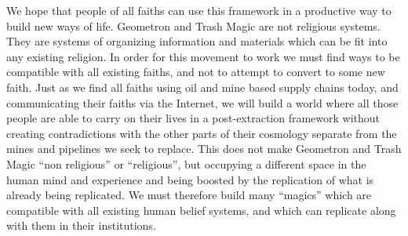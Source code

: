 We hope that people of all faiths can use this framework in a productive
way to build new ways of life. Geometron and Trash Magic are not
religious systems. They are systems of organizing information and
materials which can be fit into any existing religion. In order for this
movement to work we must find ways to be compatible with all existing
faiths, and not to attempt to convert to some new faith. Just as we find
all faiths using oil and mine based supply chains today, and
communicating their faiths via the Internet, we will build a world where
all those people are able to carry on their lives in a post-extraction
framework without creating contradictions with the other parts of their
cosmology separate from the mines and pipelines we seek to replace. This
does not make Geometron and Trash Magic ``non religious'' or
``religious'', but occupying a different space in the human mind and
experience and being boosted by the replication of what is already being
replicated. We must therefore build many ``magics'' which are compatible
with all existing human belief systems, and which can replicate along
with them in their institutions.
